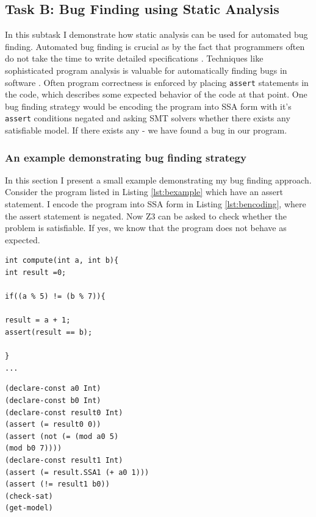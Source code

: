 \documentclass{sig-alternate-05-2015}
\begin{document}
\subsection{Task B: Bug Finding using Static Analysis}

In this subtask I demonstrate how static analysis can be used for automated bug finding. 
Automated bug finding is crucial as by the  fact  that  programmers  often do  not  take  the
time  to  write  detailed  specifications \cite{Hangal:2002}. Techniques like sophisticated 
program analysis is valuable for automatically finding bugs in software \cite{Hovemeyer:2004}. 
Often program correctness is enforced by placing \texttt{assert} statements in the code, which 
describes some expected behavior of the code at that point. One bug finding strategy would be 
encoding the program into SSA form with it's \texttt{assert} conditions negated and asking SMT 
solvers whether there exists any satisfiable model. If there exists any - we have found a bug 
in our program. 

\subsubsection{An example demonstrating bug finding strategy}

In this section I present a small example demonstrating my bug finding approach. Consider the 
program listed in Listing \ref{lst:bexample} which have an assert statement. I encode the program 
into SSA form in Listing \ref{lst:bencoding}, where the assert statement is negated. Now Z3 can 
be asked to check whether the problem is satisfiable. If yes, we know that the program does not 
behave as expected.

\begin{lstlisting}[caption={Dummy program for Task B}, label={lst:bexample}]
int compute(int a, int b){
int result =0;

if((a % 5) != (b % 7)){

result = a + 1;
assert(result == b);

}
...
\end{lstlisting}

\begin{lstlisting}[caption={Target encoding for Task B}, label={lst:bencoding}]
(declare-const a0 Int)
(declare-const b0 Int)
(declare-const result0 Int)
(assert (= result0 0))
(assert (not (= (mod a0 5)
(mod b0 7))))
(declare-const result1 Int)
(assert (= result.SSA1 (+ a0 1)))
(assert (!= result1 b0))
(check-sat)
(get-model)
\end{lstlisting}
\end{document}
